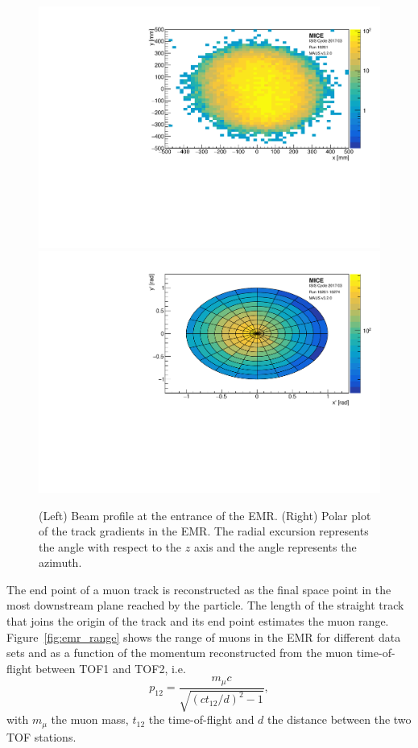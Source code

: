 \begin{figure}[htb!]
	\begin{center}
		\includegraphics[width=0.49\columnwidth]{origin.pdf}
		\hfill
		\includegraphics[width=0.49\columnwidth]{theta.pdf}
		\caption{(Left) Beam profile at the entrance of the EMR. (Right) Polar plot of the track gradients in the EMR. The radial excursion represents the angle with respect to the $z$ axis and the angle represents the azimuth.}
		\label{fig:emr_tracks}
	\end{center}
\end{figure}

The end point of a muon track is reconstructed as the final space point in the most downstream plane reached by the particle. The length of the straight track that joins the origin of the track and its end point estimates the muon range. Figure~\ref{fig:emr_range} shows the range of muons in the EMR for different data sets and as a function of the momentum reconstructed from the muon time-of-flight between TOF1 and TOF2, i.e.
\begin{equation}
p_{12} = \frac{m_\mu c}{\sqrt{\left(ct_{12}/d\right)^2-1}},
\end{equation}
with $m_\mu$ the muon mass, $t_{12}$ the time-of-flight and $d$ the distance between the two TOF stations.

